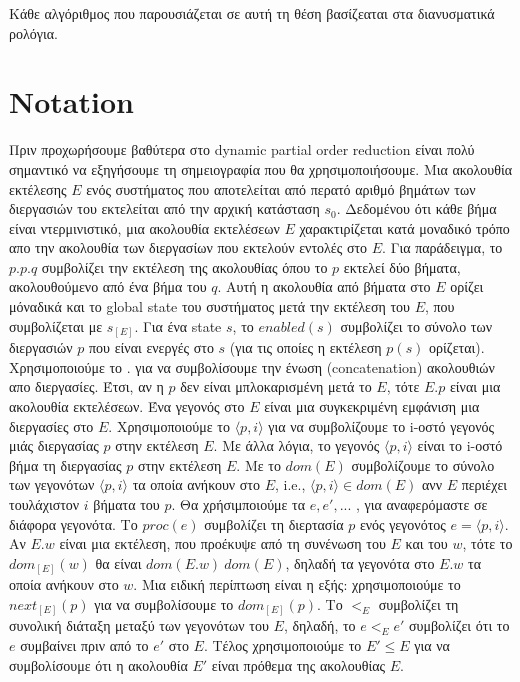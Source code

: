 
Κάθε αλγόριθμος που παρουσιάζεται σε αυτή τη θέση βασίζεαται στα διανυσματικά ρολόγια. 


\section{Notation}

Πριν προχωρήσουμε βαθύτερα στο dynamic partial order reduction είναι πολύ σημαντικό να εξηγήσουμε τη σημειογραφία που θα χρησιμοποιήσουμε.
Μια ακολουθία εκτέλεσης $E$ ενός συστήματος που αποτελείται από περατό αριθμό βημάτων των διεργασιών του εκτελείται από την αρχική κατάσταση 
$s_0$. Δεδομένου ότι κάθε βήμα είναι ντερμινιστικό, μια ακολουθία εκτελέσεων $E$ χαρακτιρίζεται κατά μοναδικό τρόπο απο την ακολουθία των διεργασίων που εκτελούν εντολές στο $E$.
Για παράδειγμα, το $p.p.q$ συμβολίζει την εκτέλεση της ακολουθίας όπου το $p$ εκτελεί δύο βήματα, ακολουθούμενο από ένα βήμα του $q$.
Αυτή η ακολουθία από βήματα στο $E$ ορίζει μόναδικά και το global state του συστήματος μετά την εκτέλεση του $E$, που συμβολίζεται με $s_{[E]}$. 
Για ένα state $s$, το $enabled(s)$ συμβολίζει το σύνολο των διεργασιών $p$ 
που είναι ενεργές στο $s$ (για τις οποίες η εκτέλεση $p(s)$ ορίζεται). Χρησιμοποιούμε το $.$ για να συμβολίσουμε την ένωση (concatenation) ακολουθιών απο διεργασίες.
Έτσι, αν η $p$ δεν είναι μπλοκαρισμένη μετά το $E$, τότε $E.p$ είναι μια ακολουθία εκτελέσεων.
Ένα γεγονός στο $E$ είναι μια συγκεκριμένη εμφάνιση μια διεργασίες στο $E$.
Χρησιμοποιούμε το $\langle p,i \rangle$ για να συμβολίζουμε το i-οστό γεγονός μιάς διεργασίας $p$ στην εκτέλεση $E$. 
Με άλλα λόγια, το γεγονός $\langle p,i \rangle$ είναι το i-οστό βήμα τη διεργασίας $p$ στην εκτέλεση $E$. 
Με το $dom(E)$ συμβολίζουμε το σύνολο των γεγονότων $\langle p,i \rangle$ τα οποία ανήκουν στο $E$, i.e., $\langle p,i \rangle \in dom(E)$ ανν $E$
περιέχει τουλάχιστον $i$ βήματα του $p$. Θα χρήσιμποιούμε τα $e,e',...$ , για αναφερόμαστε σε διάφορα γεγονότα. 
Το $proc(e)$ συμβολίζει τη διερτασία $p$ ενός γεγονότος $e = \langle p, i \rangle$.
Αν $E.w$ είναι μια εκτέλεση, που προέκυψε από τη συνένωση του $E$ και του
$w$, τότε το $dom_{[E]}(w)$ θα είναι $dom(E.w) \ dom(E)$, δηλαδή τα γεγονότα στο
$E.w$ τα οποία ανήκουν στο $w$. Μια ειδική περίπτωση είναι η εξής: χρησιμοποιούμε το  $next_{[E]}(p)$ για να συμβολίσουμε το
$dom_{[E]}(p)$.
Το $<_E$ συμβολίζει τη συνολική διάταξη μεταξύ των γεγονότων του $E$, δηλαδή, το
$e <_E e'$ συμβολίζει ότι το  $e$ συμβαίνει πριν από το $e'$ στο $E$. Τέλος
χρησιμοποιούμε το $E'\leq E$ για να συμβολίσουμε ότι η ακολουθία $E'$ είναι
πρόθεμα της ακολουθίας $E$.

